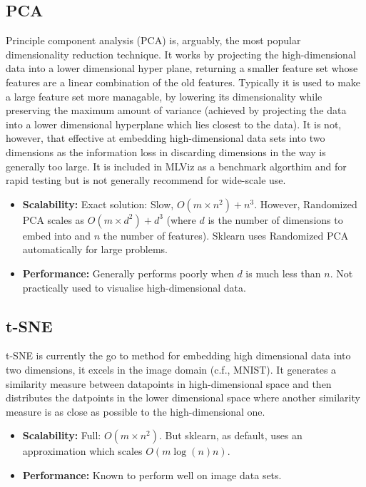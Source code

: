\documentclass[11pt]{article} %
\begin{document}
\subsection{PCA}

Principle component analysis (PCA) is, arguably, the most popular dimensionality reduction technique. It works by projecting the high-dimensional data into a lower dimensional hyper plane, returning a smaller feature set whose features are a linear combination of the old features. Typically it is used to make a large feature set more managable, by lowering its dimensionality while preserving the maximum amount of variance (achieved by projecting the data into a lower dimensional hyperplane which lies closest to the data). It is not, however, that effective at embedding high-dimensional data sets into two dimensions as the information loss in discarding dimensions in the way is generally too large. It is included in MLViz as a benchmark algorthim and for rapid testing but is not generally recommend for wide-scale use.

\begin{itemize}
\item \textbf{Scalability:} Exact solution: Slow, $O(m \times n^2) + n^3$. However, Randomized PCA scales as $O(m \times d^2) + d^3$ (where $d$ is the number of dimensions to embed into and $n$ the number of features). Sklearn uses Randomized PCA automatically for large problems.
\item \textbf{Performance:} Generally performs poorly when $d$ is much less than $n$. Not practically used to visualise high-dimensional data.
\end{itemize}

\subsection{t-SNE}

t-SNE is currently the go to method for embedding high dimensional data into two dimensions, it excels in the image domain (c.f., MNIST). It generates a similarity measure between datapoints in high-dimensional space  and then distributes the datpoints in the lower dimensional space where another similarity measure is as close as possible to the high-dimensional one.

\begin{itemize}
	\item \textbf{Scalability:}  Full: $O(m \times n^2)$. But sklearn, as default, uses an approximation which scales $O(m\log(n)n)$.	
	\item \textbf{Performance:}  Known to perform well on image data sets.
\end{itemize}
\end{document}
